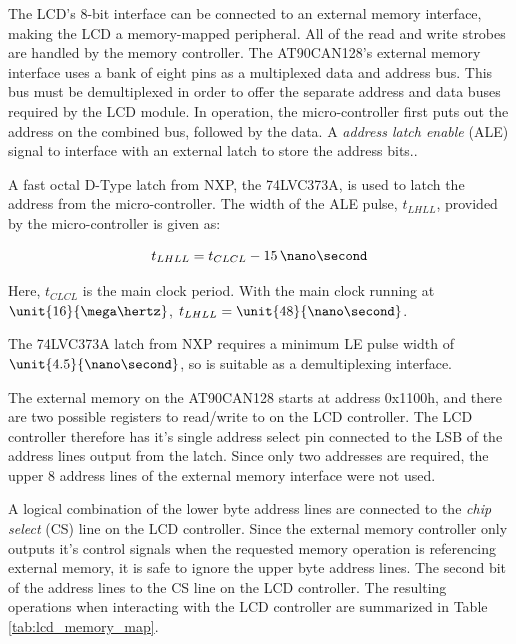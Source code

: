 The LCD's 8-bit interface can be connected to an external memory interface, making the LCD a memory-mapped peripheral. All of the read and write strobes are handled by the memory controller. The AT90CAN128's external memory interface uses a bank of eight pins as a multiplexed data and address bus. This bus must be demultiplexed in order to offer the separate address and data buses required by the LCD module. In operation, the micro-controller first puts out the address on the combined bus, followed by the data. A \emph{address latch enable} (ALE) signal to interface with an external latch to store the address bits.\cite{AT90CAN}.

A fast octal D-Type latch from NXP, the 74LVC373A, is used to latch the address from the micro-controller. The width of the ALE pulse, $t_{LHLL}$, provided by the micro-controller is given as:

\begin{equation}
t_{LHLL}=t_{CLCL}-15\, \nano\second
\end{equation}

Here, $t_{CLCL}$ is the main clock period. With the main clock running at $\unit{16}{\mega\hertz}$, $t_{LHLL}=\unit{48}{\nano\second}$.


The 74LVC373A latch from NXP requires a minimum LE pulse width of $\unit{4.5}{\nano\second}$, so is suitable as a demultiplexing interface.

The external memory on the AT90CAN128 starts at address 0x1100h, and there are two possible registers to read/write to on the LCD controller. The LCD controller therefore has it's single address select pin connected to the LSB of the address lines output from the latch. Since only two addresses are required, the upper 8 address lines of the external memory interface were not used.


A logical combination of the lower byte address lines are connected to the \emph{chip select} (CS) line on the LCD controller. Since the external memory controller only outputs it's control signals when the requested memory operation is referencing external memory, it is safe to ignore the upper byte address lines. The second bit of the address lines to the CS line on the LCD controller. The resulting operations when interacting with the LCD controller are summarized in Table \ref{tab:lcd_memory_map}.

